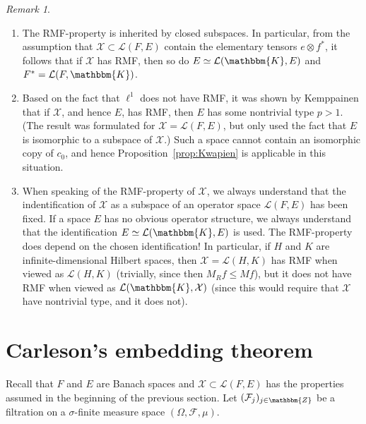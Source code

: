 \documentclass[a4paper,10pt]{amsart}
\theoremstyle{plain}
\theoremstyle{definition}
\theoremstyle{remark}
\newtheorem*{remark}{Remark}
\begin{document}
\begin{remark}\
\begin{enumerate}
\item The RMF-property is inherited by closed subspaces. In particular, from the assumption that $\mathcal{X}\subset\mathcal{L}(F,E)$ contain the elementary tensors $e\otimes f^*$, it follows that if $\mathcal{X}$ has RMF, then so do $E\simeq\mathcal{L}({\mathbbm{K}},E)$ and $F^*=\mathcal{L}(F,{\mathbbm{K}})$.

\item Based on the fact that $\ell^1$ does not have RMF, it was shown by Kemppainen \cite{RMF} that if $\mathcal{X}$, and hence $E$, has RMF, then $E$  has some nontrivial type $p>1$. (The result was formulated for $\mathcal{X}=\mathcal{L}(F,E)$, but only used the fact that $E$ is isomorphic to a subspace of $\mathcal{X}$.) Such a space cannot contain an isomorphic copy of $c_0$, and hence Proposition~\ref{prop:Kwapien} is applicable in this situation.

\item When speaking of the RMF-property of $\mathcal{X}$, we always understand that the indentification of $\mathcal{X}$ as a subspace of an operator space $\mathcal{L}(F,E)$ has been fixed. If a space $E$ has no obvious operator structure, we always understand that the identification $E\simeq\mathcal{L}({\mathbbm{K}},E)$ is used. The RMF-property does depend on the chosen identification! In particular, if $H$ and $K$ are infinite-dimensional Hilbert spaces, then $\mathcal{X}=\mathcal{L}(H,K)$ has RMF when viewed as $\mathcal{L}(H,K)$ (trivially, since then $M_Rf\leq Mf$), but it does not have RMF when viewed as $\mathcal{L}({\mathbbm{K}},\mathcal{X})$ (since this would require that $\mathcal{X}$ have nontrivial type, and it does not). 
\end{enumerate}
\end{remark}

\section{Carleson's embedding theorem}

Recall that $F$ and $E$ are Banach spaces and $\mathcal{X}\subset\mathcal{L}(F,E)$ has the properties assumed in the beginning of the previous section.
Let $(\mathcal{F}_j)_{j\in{\mathbbm{Z}}}$ be a filtration on a $\sigma$-finite measure space $(\Omega, \mathcal{F}, \mu )$.
\end{document}
